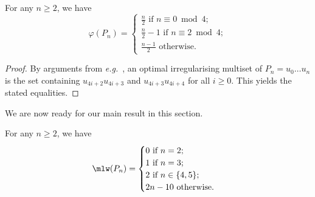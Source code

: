 \documentclass[a4paper,11pt,dvipsnames]{elsarticle}
\begin{document}
\begin{lemma}\label{lemma:varphi_paths}
For any $n \geq 2$, we have
  \[
    \varphi(P_n)=
    \begin{cases}
        \frac{n}{2}\text{ if }n \equiv 0\bmod 4;\\
        \frac{n}{2}-1\text{ if }n \equiv 2\bmod 4;\\
        \frac{n-1}{2}\text{ otherwise}.
    \end{cases}
  \]
\end{lemma}

\begin{proof}
By arguments from \textit{e.g.}~\cite{BFN22,CLWY11}, an optimal irregularising multiset of $P_n=u_0 \dots u_{n}$
is the set containing $u_{4i+2}u_{4i+3}$ and $u_{4i+3}u_{4i+4}$ for all $i \geq 0$. This yields the stated equalities. 
\end{proof}

We are now ready for our main result in this section.

\begin{theorem}\label{theorem:paths}
For any $n \geq 2$, we have
  \[
    \mlw(P_n)=
    \begin{cases}
      0\text{ if }n=2;\\
      1\text{ if }n=3;\\
      2\text{ if }n \in \{4,5\};\\
      2n-10\text{ otherwise.}\\
    \end{cases}
  \]
\end{theorem}
\end{document}
